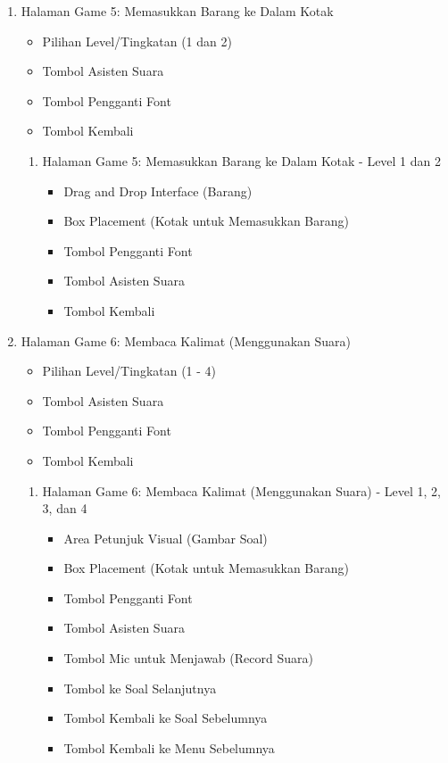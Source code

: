 \documentclass[12pt,a4paper]{report}
\begin{document}
\begin{enumerate}
\item Halaman Game 5: Memasukkan Barang ke Dalam Kotak
    \begin{itemize}
    \item Pilihan Level/Tingkatan (1 dan 2)
    \item Tombol Asisten Suara
    \item Tombol Pengganti Font
    \item Tombol Kembali
    \end{itemize}
    
    \begin{enumerate}[label=\arabic{enumi}\alph*.]
        \item Halaman Game 5: Memasukkan Barang ke Dalam Kotak - Level 1 dan 2
        \begin{itemize}
    \item Drag and Drop Interface (Barang)
    \item Box Placement (Kotak untuk Memasukkan Barang)
    \item Tombol Pengganti Font
    \item Tombol Asisten Suara
    \item Tombol Kembali
    \end{itemize}
    \end{enumerate}

\item Halaman Game 6: Membaca Kalimat (Menggunakan Suara)
    \begin{itemize}
    \item Pilihan Level/Tingkatan (1 - 4)
    \item Tombol Asisten Suara
    \item Tombol Pengganti Font
    \item Tombol Kembali
    \end{itemize}
    
    \begin{enumerate}[label=\arabic{enumi}\alph*.]
        \item Halaman Game 6: Membaca Kalimat (Menggunakan Suara) - Level 1, 2, 3, dan 4
        \begin{itemize}
    \item Area Petunjuk Visual (Gambar Soal)
    \item Box Placement (Kotak untuk Memasukkan Barang)
    \item Tombol Pengganti Font
    \item Tombol Asisten Suara
    \item Tombol Mic untuk Menjawab (Record Suara)
    \item Tombol ke Soal Selanjutnya
    \item Tombol Kembali ke Soal Sebelumnya
    \item Tombol Kembali ke Menu Sebelumnya
    \end{itemize}
    \end{enumerate}


\end{enumerate}
\end{document}
